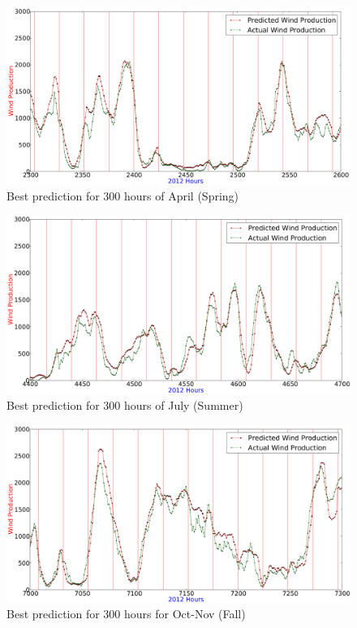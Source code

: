 \begin{figure}[H]
\centering
\includegraphics[width=0.99\linewidth]{billeder/bestPossiblePredictionWindProduction2300-2600_April_Spring.png}
\caption{Best prediction for 300 hours of April (Spring)}
\label{fig:bestWPPredictSpring}
\end{figure}

\begin{figure}[H]
\centering
\includegraphics[width=0.99\linewidth]{billeder/bestPossiblePredictionWindProduction4400-4700-Summer.png}
\caption{Best prediction for 300 hours of July (Summer)}
\label{fig:bestPredictWPSummer}
\end{figure}

\begin{figure}[H]
\centering
\includegraphics[width=0.99\linewidth]{billeder/bestPossiblePredictionWindProduction7000-7300_Fall.png}
\caption{Best prediction for 300 hours for Oct-Nov (Fall)}
\label{fig:bestPredictWPFall}
\end{figure}


